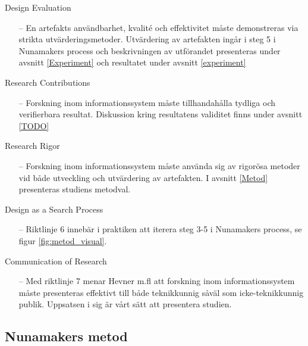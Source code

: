 \documentclass[a4paper,11pt]{article}
\begin{document}
{\begin{description}
\begin{itemize}
    \end{itemize}
    \item [Riktlinje 3]
    Design Evaluation
     \begin{itemize}
    \item [--] En artefakts användbarhet, kvalité och effektivitet måste demonstreras via strikta utvärderingsmetoder. Utvärdering av artefakten ingår i steg 5 i Nunamakers process och beskrivningen av utförandet presenteras under avsnitt \ref{Experiment} och resultatet under avsnitt \ref{experiment} 
    \end{itemize}
    \item [Riktlinje 4]
    Research Contributions
     \begin{itemize}
    \item [--] Forskning inom informationssystem måste tillhandahålla tydliga och verifierbara resultat. Diskussion kring resultatens validitet finns under avsnitt \ref{TODO}
    \end{itemize}
    \item [Riktlinje 5]
    Research Rigor
     \begin{itemize}
    \item [--] Forskning inom informationssystem måste använda sig av rigorösa metoder vid både utveckling och utvärdering av artefakten. I avsnitt \ref{Metod} presenteras studiens metodval.
    \end{itemize}
    \item [Riktlinje 6]
    Design as a Search Process
     \begin{itemize}
    \item [--] Riktlinje 6 innebär i praktiken att iterera steg 3-5 i Nunamakers process, se figur \ref{fig:metod_visual}. 
    \end{itemize}
    \item [Riktlinje 7]
    Communication of Research
     \begin{itemize}
    \item [--] Med riktlinje 7 menar Hevner m.fl att forskning inom informationssystem måste presenteras effektivt till både teknikkunnig såväl som icke-teknikkunnig publik. Uppsatsen i sig är vårt sätt att presentera studien. 
    \end{itemize}
\end{description}

\subsection{Nunamakers metod}\label{Nunamakers metod}

}
\end{document}
